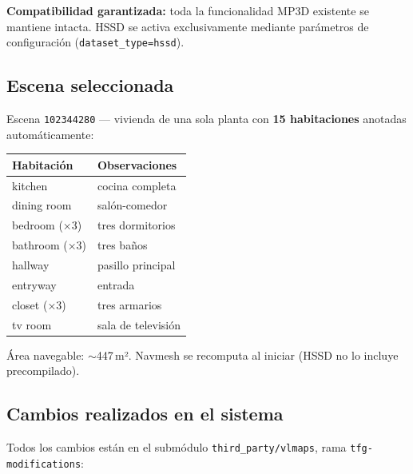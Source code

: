 \documentclass[11pt,a4paper]{article}
\begin{document}
\textbf{Compatibilidad garantizada:} toda la funcionalidad MP3D existente se mantiene intacta. HSSD se activa exclusivamente mediante parámetros de configuración (\texttt{dataset\_type=hssd}).

\subsection{Escena seleccionada}

Escena \texttt{102344280} --- vivienda de una sola planta con \textbf{15 habitaciones} anotadas automáticamente:

\begin{center}
\begin{tabular}{ll}
\toprule
\textbf{Habitación} & \textbf{Observaciones} \\
\midrule
kitchen & cocina completa \\
dining room & salón-comedor \\
bedroom (×3) & tres dormitorios \\
bathroom (×3) & tres baños \\
hallway & pasillo principal \\
entryway & entrada \\
closet (×3) & tres armarios \\
tv room & sala de televisión \\
\bottomrule
\end{tabular}
\end{center}

Área navegable: $\sim$447\,m². Navmesh se recomputa al iniciar (HSSD no lo incluye precompilado).

\subsection{Cambios realizados en el sistema}

Todos los cambios están en el submódulo \texttt{third\_party/vlmaps}, rama \texttt{tfg-modifications}:
\end{document}
